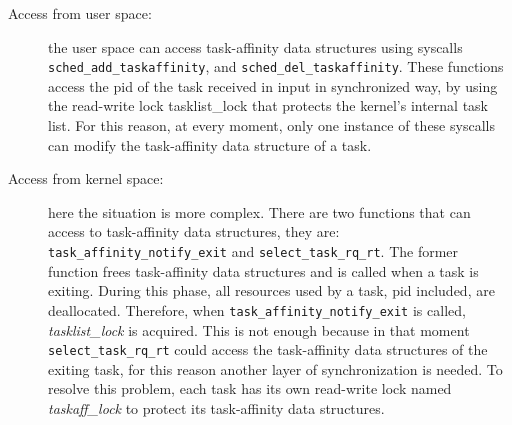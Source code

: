 \begin{description}

\item[Access from user space:] the user space can access task-affinity data structures using syscalls \texttt{sched\_add\_taskaffinity}, and 
\texttt{sched\_del\_taskaffinity}. These functions access the pid of the task received in input in synchronized way, by using the read-write lock
tasklist\_lock that protects the kernel's internal task list. For this reason, at every moment, only one instance of these syscalls can modify the
task-affinity data structure of a task.

\item[Access from kernel space:] here the situation is more complex. There are two functions that can access to task-affinity data structures, they are:\\
\texttt{task\_affinity\_notify\_exit} and \texttt{select\_task\_rq\_rt}. The former function frees task-affinity data structures and is called when a 
task is exiting. During this phase, all resources used by a task, pid included, are deallocated. Therefore, when \texttt{task\_affinity\_notify\_exit} is 
called, \textit{tasklist\_lock} is acquired. This is not enough because in that moment \texttt{select\_task\_rq\_rt} could access the task-affinity data 
structures of the exiting task, for this reason another layer of synchronization is needed. To resolve this problem, each task has its own read-write lock 
named \textit{taskaff\_lock} to protect its task-affinity data structures. 

\end{description}

